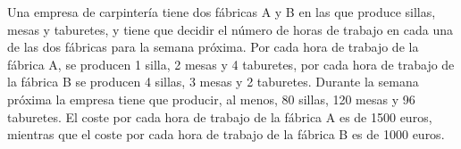 \documentclass[addpoints,spanish, 12pt,a4paper]{exam}
\begin{document}
\begin{questions}
\question Una empresa de carpintería tiene dos fábricas A y B en las que produce sillas, mesas y 
taburetes, y tiene que decidir el número de horas de trabajo en cada una de las dos fábricas para la semana 
próxima. Por cada hora de trabajo de la fábrica A, se producen 1 silla, 2 mesas y 4 taburetes, por cada hora 
de trabajo de la fábrica B se producen 4 sillas, 3 mesas y 2 taburetes. Durante la semana próxima la 
empresa tiene que producir, al menos, 80 sillas, 120 mesas y 96 taburetes. El coste por cada hora de 
trabajo de la fábrica A es de 1500 euros, mientras que el coste por cada hora de trabajo de la fábrica B es 
de 1000 euros. 

\end{questions}
\end{document}
